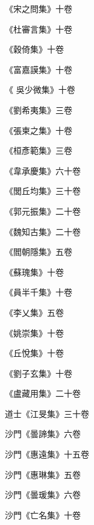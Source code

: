 \begin{pinyinscope}
 《宋之問集》十卷



 《杜審言集》十卷



 《穀倚集》十卷



 《富嘉謨集》十卷



 《
 吳少微集》十卷



 《劉希夷集》三卷



 《張柬之集》十卷



 《桓彥範集》三卷



 《韋承慶集》六十卷



 《閭丘均集》三十卷



 《郭元振集》二十卷



 《魏知古集》二十卷



 《閻朝隱集》五卷



 《蘇瑰集》十卷



 《員半千集》十卷



 《李乂集》五卷



 《姚崇集》十卷



 《丘悅集》十卷



 《劉子玄集》十卷



 《盧藏用集》二十卷



 道士《江旻集》三十卷



 沙門《曇諦集》六卷



 沙門《惠遠集》十五卷



 沙門《惠琳集》五卷



 沙門《曇瑗集》六卷



 沙門《亡名集》十卷




\end{pinyinscope}
